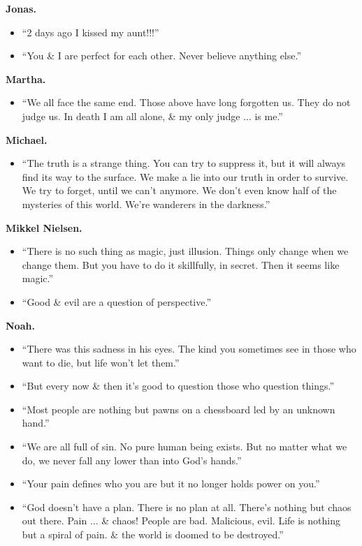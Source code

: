 \documentclass{article}
\begin{document}
\begin{enumerate}
\begin{itemize}
	\end{itemize}
	{\bf Jonas.}
	\begin{itemize}
		\item ``2 days ago I kissed my aunt!!!''
		\item ``You \& I are perfect for each other. Never believe anything else.''
	\end{itemize}
	{\bf Martha.}
	\begin{itemize}
		\item ``We all face the same end. Those above have long forgotten us. They do not judge us. In death I am all alone, \& my only judge $\ldots$ is me.''
	\end{itemize}
	{\bf Michael.}
	\begin{itemize}
		\item ``The truth is a strange thing. You can try to suppress it, but it will always find its way to the surface. We make a lie into our truth in order to survive. We try to forget, until we can't anymore. We don't even know half of the mysteries of this world. We're wanderers in the darkness.''
	\end{itemize}
	{\bf Mikkel Nielsen.}
	\begin{itemize}
		\item ``There is no such thing as magic, just illusion. Things only change when we change them. But you have to do it skillfully, in secret. Then it seems like magic.''
		\item ``Good \& evil are a question of perspective.''
	\end{itemize}
	{\bf Noah.}
	\begin{itemize}
		\item ``There was this sadness in his eyes. The kind you sometimes see in those who want to die, but life won't let them.''
		\item ``But every now \& then it's good to question those who question things.''
		\item ``Most people are nothing but pawns on a chessboard led by an unknown hand.''
		\item ``We are all full of sin. No pure human being exists. But no matter what we do, we never fall any lower than into God's hands.''
		\item ``Your pain defines who you are but it no longer holds power on you.''
		\item ``God doesn't have a plan. There is no plan at all. There's nothing but chaos out there. Pain $\ldots$ \& chaos! People are bad. Malicious, evil. Life is nothing but a spiral of pain. \& the world is doomed to be destroyed.''

\end{itemize}
\end{enumerate}
\end{document}
